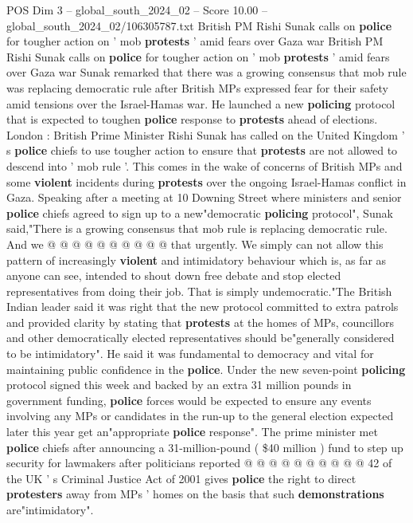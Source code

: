 \begin{textsample}{POS Dim 3 – global\_south\_2024\_02 – Score 10.00 – global\_south\_2024\_02/106305787.txt}  \label{ex:f3_pos_369}
British PM Rishi Sunak calls on \textbf{police} for tougher action on ' mob \textbf{protests} ' amid fears over Gaza war British PM Rishi Sunak calls on \textbf{police} for tougher action on ' mob \textbf{protests} ' amid fears over Gaza war Sunak remarked that there was a growing consensus that mob rule was replacing democratic rule after British MPs expressed fear for their safety amid tensions over the Israel-Hamas war.
He launched a new \textbf{policing} protocol that is expected to toughen \textbf{police} response to \textbf{protests} ahead of elections.
London : British Prime Minister Rishi Sunak has called on the United Kingdom ' s \textbf{police} chiefs to use tougher action to ensure that \textbf{protests} are not allowed to descend into ' mob rule '.
This comes in the wake of concerns of British MPs and some \textbf{violent} incidents during \textbf{protests} over the ongoing Israel-Hamas conflict in Gaza.
Speaking after a meeting at 10 Downing Street where ministers and senior \textbf{police} chiefs agreed to sign up to a new"democratic \textbf{policing} protocol", Sunak said,"There is a growing consensus that mob rule is replacing democratic rule.
And we @ @ @ @ @ @ @ @ @ @ that urgently.
We simply can not allow this pattern of increasingly \textbf{violent} and intimidatory behaviour which is, as far as anyone can see, intended to shout down free debate and stop elected representatives from doing their job.
That is simply undemocratic."The British Indian leader said it was right that the new protocol committed to extra patrols and provided clarity by stating that \textbf{protests} at the homes of MPs, councillors and other democratically elected representatives should be"generally considered to be intimidatory".
He said it was fundamental to democracy and vital for maintaining public confidence in the \textbf{police}.
Under the new seven-point \textbf{policing} protocol signed this week and backed by an extra 31 million pounds in government funding, \textbf{police} forces would be expected to ensure any events involving any MPs or candidates in the run-up to the general election expected later this year get an"appropriate \textbf{police} response".
The prime minister met \textbf{police} chiefs after announcing a 31-million-pound ( \$40 million ) fund to step up security for lawmakers after politicians reported @ @ @ @ @ @ @ @ @ @ 42 of the UK ' s Criminal Justice Act of 2001 gives \textbf{police} the right to direct \textbf{protesters} away from MPs ' homes on the basis that such \textbf{demonstrations} are"intimidatory".

\end{textsample}
